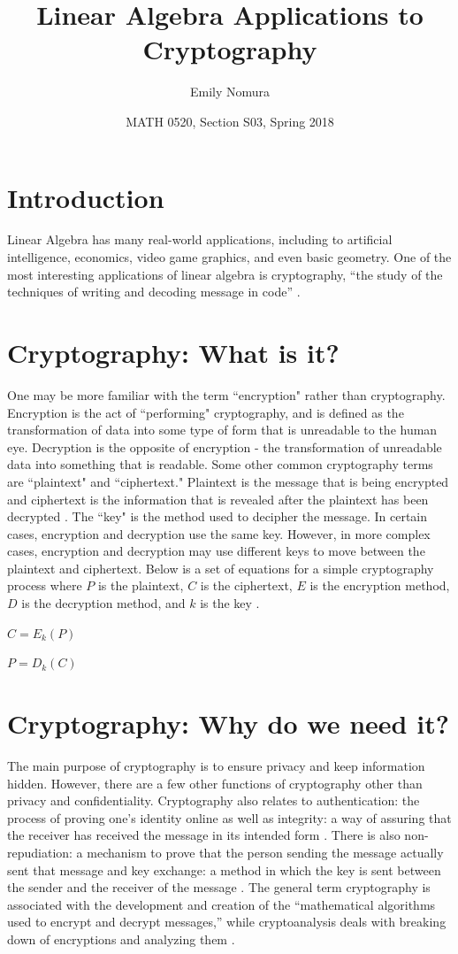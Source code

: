 \documentclass{article}
\title{Linear Algebra Applications to Cryptography}
\author{Emily Nomura}
\date{MATH 0520, Section S03, Spring 2018}
\begin{document}
\maketitle

\section{Introduction}
Linear Algebra has many real-world applications, including to artificial intelligence, economics, video game graphics, and even basic geometry. One of the most interesting applications of linear algebra is cryptography, “the study of the techniques of writing and decoding message in code” \cite{ref1:1}. 

\section{Cryptography: What is it?}
 One may be more familiar with the term ``encryption" rather than cryptography. Encryption is the act of ``performing" cryptography, and is defined as the transformation of data into some type of form that is unreadable to the human eye. Decryption is the opposite of encryption - the transformation of unreadable data into something that is readable. Some other common cryptography terms are ``plaintext" and ``ciphertext." Plaintext is the message that is being encrypted and ciphertext is the information that is revealed after the plaintext has been decrypted \cite{ref1:1}. The ``key" is the method used to decipher the message. In certain cases, encryption and decryption use the same key. However, in more complex cases, encryption and decryption may use different keys to move between the plaintext and ciphertext. Below is a set of equations for a simple cryptography process where $P$ is the plaintext, $C$ is the ciphertext, $E$ is the encryption method, $D$ is the decryption method, and $k$ is the key \cite{ref2:2}.

{\center $C = E_{k}(P)$

$P = D_{k}(C)$
\endcenter}


\section{Cryptography: Why do we need it?}
The main purpose of cryptography is to ensure privacy and keep information hidden. However, there are a few other functions of cryptography other than privacy and confidentiality. Cryptography also relates to authentication: the process of proving one’s identity online as well as integrity: a way of assuring that the receiver has received the message in its intended form \cite{ref2:2}. There is also non-repudiation: a mechanism to prove that the person sending the message actually sent that message and key exchange: a method in which the key is sent between the sender and the receiver of the message \cite{ref2:2}. The general term cryptography is associated with the development and creation of the “mathematical algorithms used to encrypt and decrypt messages,” while cryptoanalysis deals with breaking down of encryptions and analyzing them \cite{ref2:2}.
\end{document}
